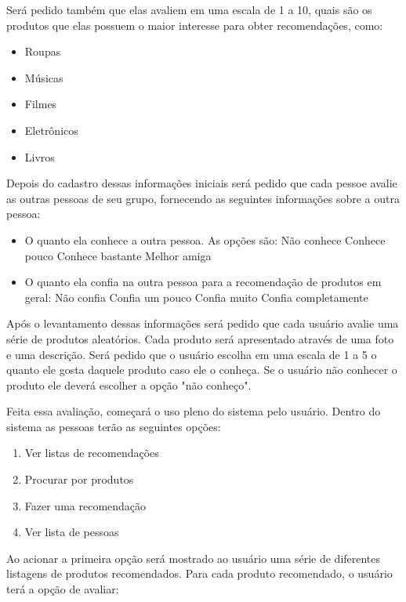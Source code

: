  Será pedido também que elas avaliem em uma escala de 1 a 10, quais são os produtos que elas possuem o maior interesse para obter recomendações, como:

\begin{itemize}
	\item Roupas
	\item Músicas
	\item Filmes
	\item Eletrônicos
	\item Livros
\end{itemize}

	Depois do cadastro dessas informações iniciais será pedido que cada pessoe avalie as outras pessoas de seu grupo, fornecendo as seguintes informações sobre a outra pessoa:

\begin{itemize}
	\item O quanto ela conhece a outra pessoa. As opções são:
	\subitem Não conhece
  \subitem Conhece pouco
  \subitem Conhece bastante
  \subitem Melhor amiga
  \item O quanto ela confia na outra pessoa para a recomendação de produtos em geral:
  \subitem Não confia
	\subitem Confia um pouco
  \subitem Confia muito
  \subitem Confia completamente
\end{itemize}

 Após o levantamento dessas informações será pedido que cada usuário avalie uma série de produtos aleatórios. Cada produto será apresentado através de uma foto e uma descrição. Será pedido que o usuário escolha em uma escala de 1 a 5 o quanto ele gosta daquele produto caso ele o conheça. Se o usuário não conhecer o produto ele deverá escolher a opção "não conheço".

 Feita essa avaliação, começará o uso pleno do sistema pelo usuário. Dentro do sistema as pessoas terão as seguintes opções:
\begin{enumerate}
	\item Ver listas de recomendações
	\item Procurar por produtos
	\item Fazer uma recomendação
	\item Ver lista de pessoas
\end{enumerate}

 Ao acionar a primeira opção será mostrado ao usuário uma série de diferentes listagens de produtos recomendados. Para cada produto recomendado, o usuário terá a opção de avaliar:

